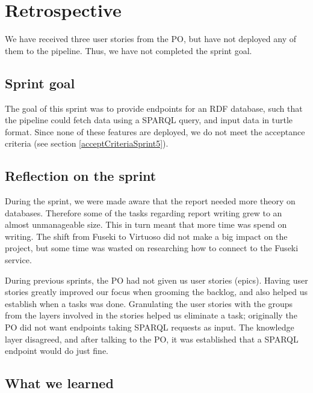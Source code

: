 \section{Retrospective}
We have received three user stories from the PO, but have not deployed any of them to the \knox pipeline. Thus, we have not completed the sprint goal.

\subsection{Sprint goal}
The goal of this sprint was to provide endpoints for an RDF database, such that the \knox pipeline could fetch data using a SPARQL query, and input data in turtle format.
Since none of these features are deployed, we do not meet the acceptance criteria (see section \ref{acceptCriteriaSprint5}).



\subsection{Reflection on the sprint}
During the sprint, we were made aware that the report needed more theory on databases. 
Therefore some of the tasks regarding report writing grew to an almost unmanageable size. This in turn meant that more time was spend on writing.
The shift from Fuseki to Virtuoso did not make a big impact on the project, but some time was wasted on researching how to connect to the Fuseki service. 

During previous sprints, the PO had not given us user stories (epics). Having user stories greatly improved our focus when grooming the backlog, and also helped us establish when a tasks was done. 
Granulating the user stories with the groups from the layers involved in the stories helped us eliminate a task; 
originally the PO did not want endpoints taking SPARQL requests as input.
The knowledge layer disagreed, and after talking to the PO, it was established that a SPARQL endpoint would do just fine.


\subsection{What we learned}

